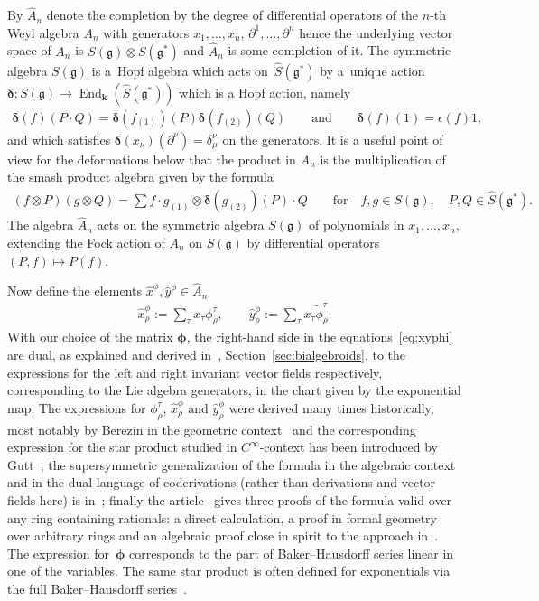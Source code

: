 \documentclass[pdftex]{sigma}
\def\genfd{\mathbf{k}}
\def\gg{\mathfrak{g}}
\def\End{\operatorname{End}}
\numberwithin{equation}{section}
\begin{document}
By $\hat{A}_n$ denote the completion by the degree of differential operators of the $n$-th Weyl algebra $A_n$ with generators $x_1,\dots,x_n$, $\partial^1,\dots,\partial^n$ hence the underlying vector space of $A_n$ is $S(\gg)\otimes S(\gg^*)$ and $\hat{A}_n$ is some completion of it. The symmetric algebra $S(\gg)$ is a~Hopf algebra which acts on~$\hat{S}(\gg^*)$ by a~unique action ${\boldsymbol \delta}\colon S(\gg)\to\End_\genfd(\hat{S}(\gg^*))$ which is a Hopf action, namely
\begin{gather*}{\boldsymbol \delta}(f)(P\cdot Q)={\boldsymbol \delta}(f_{(1)})(P){\boldsymbol \delta}(f_{(2)})(Q)\qquad \text{and}\qquad {\boldsymbol \delta}(f)(1) = \epsilon(f) 1, \end{gather*}
and which satisfies ${\boldsymbol \delta}(x_\nu)(\partial^\nu) = \delta^\nu_\mu$ on the generators. It is a useful point of view for the deformations below that the product in $A_n$ is the multiplication of the smash product algebra given by the formula
\begin{gather*}(f\otimes P) (g\otimes Q) = \sum f\cdot g_{(1)}\otimes {\boldsymbol \delta}(g_{(2)})(P)\cdot Q\qquad \text{for}\quad f,g\in S(\gg),\quad P,Q\in\hat{S}(\gg^*).\end{gather*}
The algebra $\hat{A}_n$ acts on the symmetric algebra $S(\gg)$ of polynomials in $x_1,\dots,x_n$, extending the Fock action of $A_n$ on $S(\gg)$ by differential operators $(P,f)\mapsto P(f)$.

Now define the elements $\hat{x}^\phi,\hat{y}^\phi\in\hat{A}_n$
\begin{gather}\label{eq:xyphi}
\hat{x}^\phi_\rho := \sum_\tau x_\tau \phi^\tau_\rho,\qquad \hat{y}^\phi_\rho := \sum_\tau x_\tau\tilde\phi^\tau_\rho.
\end{gather}
With our choice of the matrix ${\boldsymbol \phi}$, the right-hand side in the equations~\eqref{eq:xyphi} are dual, as explained and derived in~\cite{halg}, Section~\ref{sec:bialgebroids}, to the expressions for the left and right invariant vector fields respectively, corresponding to the Lie algebra generators, in the chart given by the exponential map. The expressions for $\phi^\tau_\rho$, $\hat{x}^\phi_\rho$ and $\hat{y}^\phi_\rho$ were derived many times historically, most notably by Berezin in the geometric context~\cite{berezin} and the corresponding expression for the star product studied in $C^\infty$-context has been introduced by Gutt~\cite{gutt}; the supersymmetric generalization of the formula in the algebraic context and in the dual language of coderivations (rather than derivations and vector fields here) is in~\cite{Petracci}; finally the article~\cite{ldWeyl} gives three proofs of the formula valid over any ring containing rationals: a direct calculation, a proof in formal geometry over arbitrary rings and an algebraic proof close in spirit to the approach in~\cite{Petracci}. The expression for~${\boldsymbol \phi}$ corresponds to the part of Baker--Hausdorff series linear in one of the variables. The same star product is often defined for exponentials via the full Baker--Hausdorff series~\cite{Amelino,HallidaySzabo,exp}.
\end{document}

